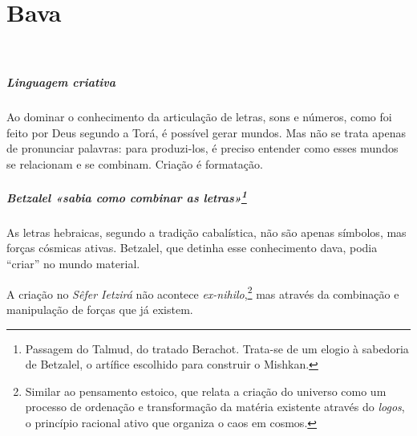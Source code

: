 \chapter*{Bava 
\smallskip{}}

\begin{center}
{\huge{}}\\\medskip{\footnotesize\formularlight{
\lipsum[2]
}}
\end{center}


\paragraph{Linguagem criativa} Ao dominar o conhecimento da articulação de letras, sons e números, como foi feito por Deus segundo a Torá, é possível gerar mundos. Mas não se trata apenas de pronunciar palavras: para produzi-los, é preciso entender como esses mundos se relacionam e se combinam. Criação é formatação.

\paragraph{Betzalel «sabia como combinar as letras»\footnote{Passagem do Talmud, do tratado Berachot. Trata-se de um elogio à sabedoria de Betzalel, o artífice escolhido para construir o Mishkan.}} As letras hebraicas, segundo a tradição cabalística, não são apenas símbolos, mas forças cósmicas ativas. Betzalel, que detinha esse conhecimento dava, podia ``criar'' no mundo material.

A criação no \textit{Sêfer Ietzirá} não acontece \textit{ex-nihilo},\footnote{Similar ao pensamento estoico, que relata a criação do universo como um processo de ordenação e transformação da matéria existente através do \textit{logos}, o princípio racional ativo que organiza o caos em cosmos.} mas através da combinação e manipulação de forças que já existem.

